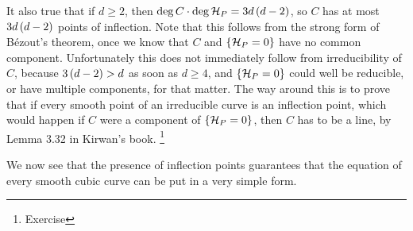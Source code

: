 \begin{remark}
\label{rem:13.6}
It also true that if $ d \ge 2 $, then $ \deg C \cdot \deg \HHH_P = 3d\br{d - 2} $, so $ C $ has at most $ 3d\br{d - 2} $ points of inflection. Note that this follows from the strong form of B\'ezout's theorem, once we know that $ C $ and $ \cbr{\HHH_P = 0} $ have no common component. Unfortunately this does not immediately follow from irreducibility of $ C $, because $ 3\br{d - 2} > d $ as soon as $ d \ge 4 $, and $ \cbr{\HHH_P = 0} $ could well be reducible, or have multiple components, for that matter. The way around this is to prove that if every smooth point of an irreducible curve is an inflection point, which would happen if $ C $ were a component of $ \cbr{\HHH_P = 0} $, then $ C $ has to be a line, by Lemma 3.32 in Kirwan's book. \footnote{Exercise}
\end{remark}

We now see that the presence of inflection points guarantees that the equation of every smooth cubic curve can be put in a very simple form.


